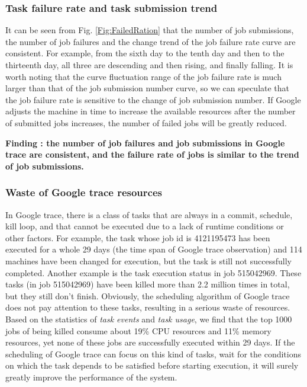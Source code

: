 \documentclass[conference]{IEEEtran}
\begin{document}
\subsubsection{Task failure rate and task submission trend}\label{Sec:failure}
It can be seen from Fig. \ref{Fig:FailedRation}  that the number of job submissions, the number of job failures and the change trend of the job failure rate curve are consistent. For example, from the sixth day to the tenth day and then to the thirteenth day, all three are descending and then rising, and finally falling. It is worth noting that the curve fluctuation range of the job failure rate is much larger than that of the job submission number curve, so we can speculate that the job failure rate is sensitive to the change of job submission number. If Google adjusts the machine in time to increase the available resources after the number of submitted jobs increases, the number of failed jobs will be greatly reduced.

{\bfseries Finding \theFindingcounter: the number of job failures and job submissions in Google trace are consistent, and the failure rate of jobs is similar to the trend of job submissions.}


\subsubsection{Waste of Google trace resources}
In Google trace, there is a class of tasks that are always in a commit, schedule, kill loop, and that cannot be executed due to a lack of runtime conditions or other factors. For example, the task whose job id is 4121195473 has been executed for a whole 29 days (the time span of Google trace observation) and 114 machines have been changed for execution, but the task is still not successfully completed. Another example is the task execution status in job 515042969. These tasks (in job 515042969) have been killed more than 2.2 million times in total, but they still don't finish. Obviously, the scheduling algorithm of Google trace does not pay attention to these tasks, resulting in a serious waste of resources. Based on the statistics of \emph{task events} and \emph{task usage}, we find that the top 1000 jobs of being killed consume about 19\% CPU resources and 11\% memory resources, yet none of these jobs are successfully executed within 29 days. If the scheduling of Google trace can focus on this kind of tasks, wait for the conditions on which the task depends to be satisfied before starting execution, it will surely greatly improve the performance of the system.
\end{document}
